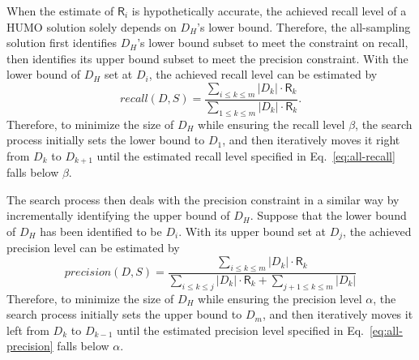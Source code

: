   When the estimate of $\mathsf{R}_i$ is hypothetically accurate, the achieved recall level of a HUMO solution solely depends on $D_H$'s lower bound. Therefore, the all-sampling solution first identifies $D_H$'s lower bound subset to meet the constraint on recall, then identifies its upper bound subset to meet the precision constraint. With the lower bound of $D_H$ set at $D_i$, the achieved recall level can be estimated by
\begin{equation}
\label{eq:all-recall}
  recall(D,S)=\frac{\sum_{i\leq k\leq m}{|D_k|\cdot \mathsf{R}_k}}{\sum_{1\leq k\leq m}{|D_k|\cdot \mathsf{R}_k}}.
\end{equation}
Therefore, to minimize the size of $D_H$ while ensuring the recall level $\beta$, the search process initially sets the lower bound to $D_1$, and then iteratively moves it right from $D_k$ to $D_{k+1}$ until the estimated recall level specified in Eq.~\ref{eq:all-recall} falls below $\beta$.

  The search process then deals with the precision constraint in a similar way by incrementally identifying the upper bound of $D_H$. Suppose that the lower bound of $D_H$ has been identified to be $D_i$. With its upper bound set at $D_j$, the achieved precision level can be estimated by
\begin{equation}
\label{eq:all-precision}
  precision(D,S)=\frac{\sum_{i\leq k\leq m}{|D_k|\cdot \mathsf{R}_k}}{\sum_{i\leq k\leq j}{|D_k|\cdot \mathsf{R}_k}+\sum_{j+1\leq k\leq m}{|D_k|}}
\end{equation}
Therefore, to minimize the size of $D_H$ while ensuring the precision level $\alpha$, the search process initially sets the upper bound to $D_m$, and then iteratively moves it left from $D_{k}$ to $D_{k-1}$ until the estimated precision level specified in Eq.~\ref{eq:all-precision} falls below $\alpha$.



